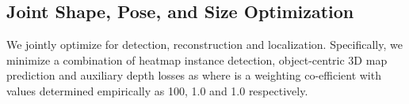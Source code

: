 \documentclass[letter, 10pt, conference]{ieeeconf}
\begin{document}
\begin{table*}[t]
    \centering
    \scriptsize
    \renewcommand{\arraystretch}{1.3}
    \vspace{-1mm}
    \caption{
    \textbf{Quantitative comparison of 3D shape reconstruction on NOCS}~\cite{wang2019normalized}: Evaluated with \textbf{CD} metric ( Lower is better.
}
    
    \label{reconstruction_nocs}
    \vspace{-5mm}
\end{table*} \subsection{Joint Shape, Pose, and Size Optimization}
\label{optimize}
We jointly optimize for detection, reconstruction and localization. Specifically, we minimize a combination of heatmap instance detection, object-centric 3D map prediction and auxiliary depth losses as 
where  is a weighting co-efficient with values determined empirically as 100, 1.0 and 1.0 respectively.
\end{document}
